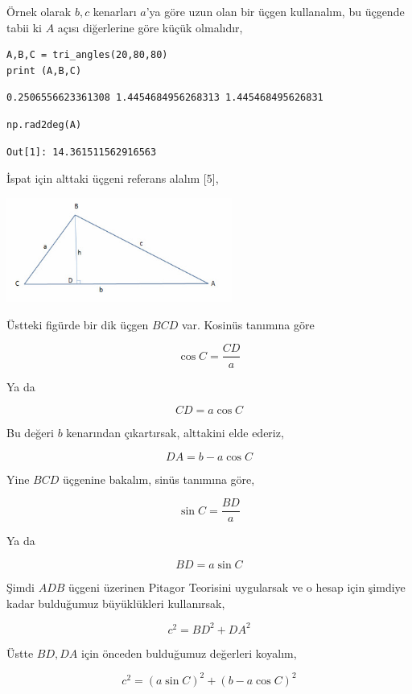 \documentclass[12pt,fleqn]{article}\usepackage{../../common}
\begin{document}
Örnek olarak $b,c$ kenarları $a$'ya göre uzun olan bir üçgen kullanalım,
bu üçgende tabii ki $A$ açısı diğerlerine göre küçük olmalıdır,

\begin{verbatim}
A,B,C = tri_angles(20,80,80)
print (A,B,C)
\end{verbatim}

\begin{verbatim}
0.2506556623361308 1.4454684956268313 1.445468495626831
\end{verbatim}   

\begin{verbatim}
np.rad2deg(A)
\end{verbatim}

\begin{verbatim}
Out[1]: 14.361511562916563
\end{verbatim}

İspat için alttaki üçgeni referans alalım [5],

\includegraphics[width=20em]{loc2.jpg}

Üstteki figürde bir dik üçgen $BCD$ var. Kosinüs tanımına göre

$$
\cos C = \frac{CD}{a}
$$

Ya da

$$
CD = a \cos C
$$

Bu değeri $b$ kenarından çıkartırsak, alttakini elde ederiz,

$$
DA = b - a \cos C
$$

Yine $BCD$ üçgenine bakalım, sinüs tanımına göre,

$$
\sin C = \frac{BD}{a}
$$

Ya da

$$
BD = a \sin C
$$

Şimdi $ADB$ üçgeni üzerinen Pitagor Teorisini uygularsak ve o hesap için şimdiye
kadar bulduğumuz büyüklükleri kullanırsak,

$$
c^2 = BD^2 + DA^2
$$

Üstte $BD,DA$ için önceden bulduğumuz değerleri koyalım,

$$
c^2 = (a \sin C)^2 + (b - a \cos C)^2
$$
\end{document}

